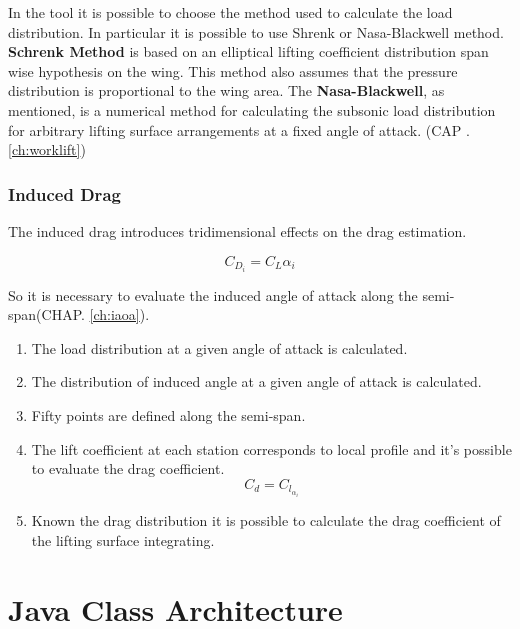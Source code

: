 	In the tool it is possible to choose the method used to calculate the load distribution. In particular it is possible to use Shrenk or Nasa-Blackwell method.\\
{\bfseries Schrenk Method} is based on an elliptical lifting coefficient distribution span wise hypothesis on the wing. This method also assumes that the pressure distribution is proportional to the wing area. 
	The {\bfseries Nasa-Blackwell}, as mentioned, is a numerical method for calculating the subsonic load distribution for arbitrary lifting surface arrangements at a fixed angle of attack. (CAP . \ref{ch:worklift})


\subsubsection{Induced Drag}

The induced drag introduces tridimensional effects on the drag estimation.

\begin{equation}
C_{D_i} = C_L \alpha_i
\end{equation}

So it is necessary to evaluate the induced angle of attack along the semi-span(CHAP. \ref{ch:iaoa}).
	
\begin{enumerate}
	\item The load distribution at a given angle of attack is calculated.
	\item The distribution of induced angle at a given angle of attack is calculated.
	\item Fifty points are defined along the semi-span.
	\item The lift coefficient at each station corresponds to local profile and it’s possible to evaluate the drag coefficient.
	\begin{equation}
	C_d =C_{l_{\alpha_i}}
	\end{equation}
	\item Known the drag distribution it is possible to calculate the drag coefficient of the lifting surface integrating.
\end{enumerate}



\section{Java Class Architecture}

